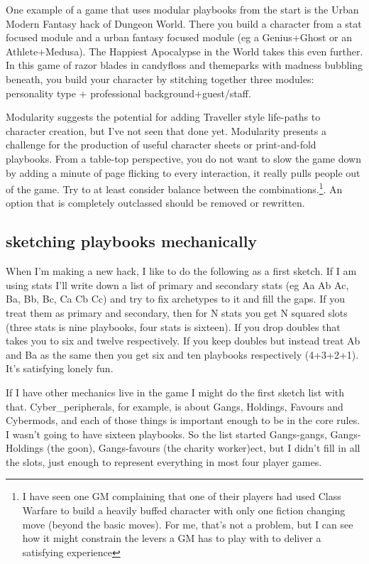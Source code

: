 \documentclass{tufte-handout}
\begin{document}
One example of a game that uses modular playbooks from the start is the Urban Modern Fantasy hack of Dungeon World. There you build a character from a stat focused module and a urban fantasy focused module (eg a Genius+Ghost or an Athlete+Medusa).  The Happiest Apocalypse in the World takes this even further. In this game of razor blades in candyfloss and themeparks with madness bubbling beneath, you build your character by stitching together three modules: personality type + professional background+guest/staff.

Modularity suggests the potential for adding Traveller style life-paths to character creation, but I've not seen that done yet. Modularity presents a challenge for the production of useful character sheets or print-and-fold playbooks. From a table-top perspective, you do not want to slow the game down by adding a minute of page flicking to every interaction, it really pulls people out of the game. Try to at least consider balance between the combinations.\footnote{I have seen one GM complaining that one of their players had used Class Warfare to build a heavily buffed character with only one fiction changing move (beyond the basic moves). For me, that's not a problem, but I can see how it might constrain the levers a GM has to play with to deliver a satisfying experience}. An option that is completely outclassed should be removed or rewritten. 

\subsection{sketching playbooks mechanically}
When I'm making a new hack, I like to do the following as a first sketch. If I am using stats I'll write down a list of primary and secondary stats (eg Aa Ab Ac, Ba, Bb, Bc, Ca Cb Cc) and try to fix archetypes to it and fill the gaps. If you treat them as primary and secondary, then for N stats you get N squared slots (three stats is nine playbooks, four stats is sixteen). If you drop doubles that takes you to six and twelve respectively. If you keep doubles but instead treat Ab and Ba as the same then you get six and ten playbooks respectively (4+3+2+1). It's satisfying lonely fun. 

If I have other mechanics live in the game I might do the first sketch list with that. Cyber\_peripherals, for example, is about Gangs, Holdings, Favours and Cybermods, and each of those things is important enough to be in the core rules. I wasn't going to have sixteen playbooks. So the list started Gangs-gangs, Gangs-Holdings (the goon), Gangs-favours (the charity worker)ect, but I didn't fill in all the slots, just enough to represent everything in most four player games.
\end{document}
